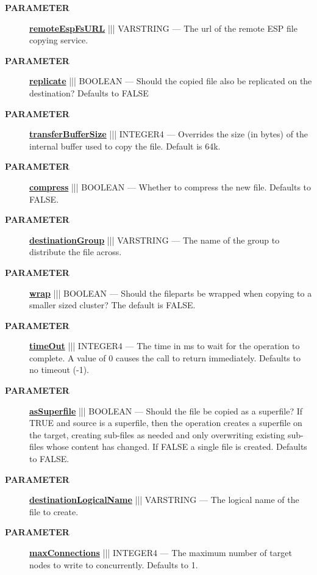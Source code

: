 \par
\begin{description}
\item [\colorbox{tagtype}{\color{white} \textbf{\textsf{PARAMETER}}}] \textbf{\underline{remoteEspFsURL}} ||| VARSTRING --- The url of the remote ESP file copying service.
\item [\colorbox{tagtype}{\color{white} \textbf{\textsf{PARAMETER}}}] \textbf{\underline{replicate}} ||| BOOLEAN --- Should the copied file also be replicated on the destination? Defaults to FALSE
\item [\colorbox{tagtype}{\color{white} \textbf{\textsf{PARAMETER}}}] \textbf{\underline{transferBufferSize}} ||| INTEGER4 --- Overrides the size (in bytes) of the internal buffer used to copy the file. Default is 64k.
\item [\colorbox{tagtype}{\color{white} \textbf{\textsf{PARAMETER}}}] \textbf{\underline{compress}} ||| BOOLEAN --- Whether to compress the new file. Defaults to FALSE.
\item [\colorbox{tagtype}{\color{white} \textbf{\textsf{PARAMETER}}}] \textbf{\underline{destinationGroup}} ||| VARSTRING --- The name of the group to distribute the file across.
\item [\colorbox{tagtype}{\color{white} \textbf{\textsf{PARAMETER}}}] \textbf{\underline{wrap}} ||| BOOLEAN --- Should the fileparts be wrapped when copying to a smaller sized cluster? The default is FALSE.
\item [\colorbox{tagtype}{\color{white} \textbf{\textsf{PARAMETER}}}] \textbf{\underline{timeOut}} ||| INTEGER4 --- The time in ms to wait for the operation to complete. A value of 0 causes the call to return immediately. Defaults to no timeout (-1).
\item [\colorbox{tagtype}{\color{white} \textbf{\textsf{PARAMETER}}}] \textbf{\underline{asSuperfile}} ||| BOOLEAN --- Should the file be copied as a superfile? If TRUE and source is a superfile, then the operation creates a superfile on the target, creating sub-files as needed and only overwriting existing sub-files whose content has changed. If FALSE a single file is created. Defaults to FALSE.
\item [\colorbox{tagtype}{\color{white} \textbf{\textsf{PARAMETER}}}] \textbf{\underline{destinationLogicalName}} ||| VARSTRING --- The logical name of the file to create.
\item [\colorbox{tagtype}{\color{white} \textbf{\textsf{PARAMETER}}}] \textbf{\underline{maxConnections}} ||| INTEGER4 --- The maximum number of target nodes to write to concurrently. Defaults to 1.

\end{description}
